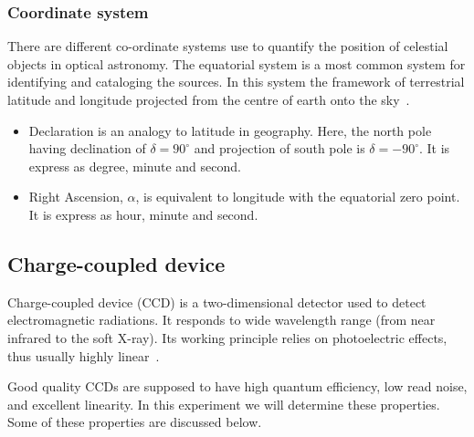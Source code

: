 \subsubsection{Coordinate system}
There are different co-ordinate systems 
use to quantify the position of celestial objects in optical astronomy. The equatorial system is a most common system for identifying and cataloging the sources. In this system the framework of terrestrial latitude and longitude projected from the centre of earth onto the sky~\cite{manual}.
\begin{itemize}
	\item Declaration is an analogy to latitude in geography. Here, the north pole having declination of $ \delta=90^{\circ} $ and projection of south pole is  $ \delta= -90^{\circ} $. It is express as degree, minute and second. 
	\item Right Ascension, $\alpha $, is equivalent to longitude with the equatorial zero point. It is express as hour, minute and second.
\end{itemize}

\subsection{Charge-coupled device}
Charge-coupled device (CCD) is a two-dimensional detector used to detect electromagnetic radiations. It responds to wide wavelength range (from near infrared to the soft X-ray). Its working principle relies on photoelectric effects, thus usually highly linear~\cite{manual}.


Good quality CCDs are supposed to have high quantum efficiency, low read noise, and excellent linearity. In this experiment we will determine these properties. Some of these properties are discussed below.

